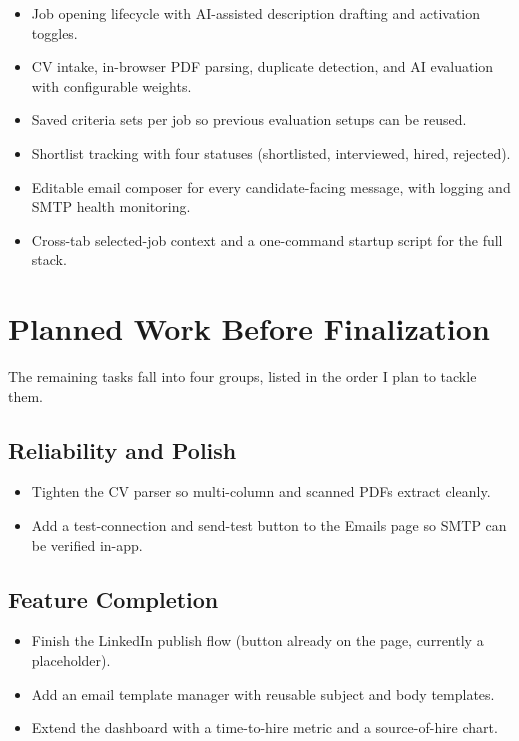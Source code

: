 \documentclass[12pt]{article}
\begin{document}
\begin{itemize}
    \item Job opening lifecycle with AI-assisted description drafting and activation toggles.
    \item CV intake, in-browser PDF parsing, duplicate detection, and AI evaluation with configurable weights.
    \item Saved criteria sets per job so previous evaluation setups can be reused.
    \item Shortlist tracking with four statuses (shortlisted, interviewed, hired, rejected).
    \item Editable email composer for every candidate-facing message, with logging and SMTP health monitoring.
    \item Cross-tab selected-job context and a one-command startup script for the full stack.
\end{itemize}

\section{Planned Work Before Finalization}

The remaining tasks fall into four groups, listed in the order I plan to tackle them.

\subsection{Reliability and Polish}

\begin{itemize}
    \item Tighten the CV parser so multi-column and scanned PDFs extract cleanly.
    \item Add a test-connection and send-test button to the Emails page so SMTP can be verified in-app.
\end{itemize}

\subsection{Feature Completion}

\begin{itemize}
    \item Finish the LinkedIn publish flow (button already on the page, currently a placeholder).
    \item Add an email template manager with reusable subject and body templates.
    \item Extend the dashboard with a time-to-hire metric and a source-of-hire chart.
\end{itemize}
\end{document}

